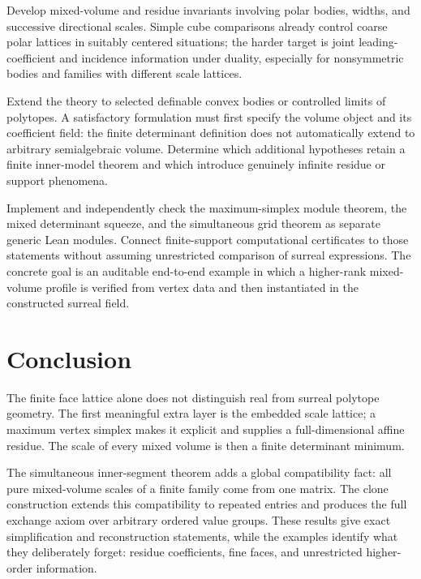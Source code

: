 \documentclass[11pt,a4paper]{article}
\numberwithin{equation}{section}
\theoremstyle{plain}
\begin{document}
\begin{question}
Develop mixed-volume and residue invariants involving polar bodies,
widths, and successive directional scales. Simple cube comparisons already
control coarse polar lattices in suitably centered situations; the harder
target is joint leading-coefficient and incidence information under duality,
especially for nonsymmetric bodies and families with different scale
lattices.
\end{question}

\begin{question}
Extend the theory to selected definable convex bodies or controlled limits
of polytopes. A satisfactory formulation must first specify the volume
object and its coefficient field: the finite determinant definition does
not automatically extend to arbitrary semialgebraic volume. Determine
which additional hypotheses retain a finite inner-model theorem and which
introduce genuinely infinite residue or support phenomena.
\end{question}

\begin{question}
Implement and independently check the maximum-simplex module theorem,
the mixed determinant squeeze, and the simultaneous grid theorem as
separate generic Lean modules. Connect finite-support computational
certificates to those statements without assuming unrestricted comparison
of surreal expressions. The concrete goal is an auditable end-to-end
example in which a higher-rank mixed-volume profile is verified from
vertex data and then instantiated in the constructed surreal field.
\end{question}

\section{Conclusion}
The finite face lattice alone does not distinguish real from surreal
polytope geometry. The first meaningful extra layer is the embedded
scale lattice; a maximum vertex simplex makes it explicit and supplies a
full-dimensional affine residue. The scale of every mixed volume is then
a finite determinant minimum.

The simultaneous inner-segment theorem adds a global compatibility fact:
all pure mixed-volume scales of a finite family come from one matrix.
The clone construction extends this compatibility to repeated entries and
produces the full exchange axiom over arbitrary ordered value groups.
These results give exact simplification and reconstruction statements,
while the examples identify what they deliberately forget: residue
coefficients, fine faces, and unrestricted higher-order information.
\end{document}
